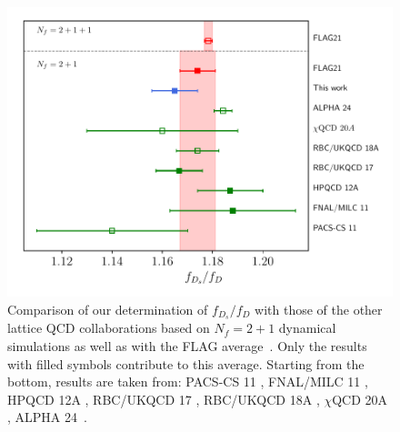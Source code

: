 \begin{figure}
	\centering
	\includegraphics[scale=0.7]{./cap6/figs/fds/ratio_fds_comparison.pdf}
	\caption{Comparison of our determination of $f_{D_s}/f_D$ with those of the other lattice QCD collaborations based on $N_f=2+1$ dynamical simulations as well as with the FLAG average~\cite{FlavourLatticeAveragingGroupFLAG:2021npn}. Only the results with filled symbols contribute to this average. Starting from the bottom, results are taken from:  PACS-CS 11 \cite{PACS-CS:2011ngu}, FNAL/MILC 11  \cite{FermilabLattice:2011njy}, HPQCD 12A \cite{Na:2012iu},  RBC/UKQCD 17 \cite{Boyle:2017jwu}, RBC/UKQCD 18A \cite{Boyle:2018knm},  $\chi$QCD 20A \cite{Chen:2020qma}, ALPHA 24~\citep{Kuberski:2024pms}. }
	\label{fig:fds_over_fd_comparison}
\end{figure}





